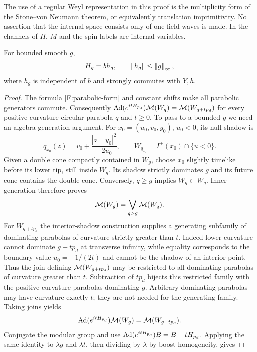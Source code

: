 The use of a regular Weyl representation in this proof is the
multiplicity form of the Stone--von Neumann theorem, or equivalently
translation imprimitivity. No assertion that the internal space consists
only of one-field waves is made. In the channels of $\Pi$, $M$ and the
spin labels are internal variables.

\begin{proposition}
\label{F:bounded-commutation}
For bounded smooth $g$,
\[
 H_g=bh_g,\qquad \left\lVert h_g\right\rVert\le\left\lVert g\right\rVert_\infty,
\]
where $h_g$ is independent of $b$ and strongly commutes with $Y,h$.
\end{proposition}

\begin{proof}
The formula \eqref{F:parabolic-form} and constant shifts make all
parabolic generators commute. Consequently
$\operatorname{Ad}(e^{itH_{p_d}})\mathcal M(W_q)=\mathcal M(W_{q+tp_d})$ for every
positive-curvature circular parabola $q$ and $t\ge0$.
To pass to a bounded $g$ we need an algebra-generation argument.
For $x_0=(u_0,v_0,y_0)$, $u_0<0$, its null shadow is
\[
 q_{x_0}(z)=v_0+\frac{|z-y_0|^2}{-2u_0},\qquad
 W_{q_{x_0}}=I^+(x_0)\cap\{u<0\}.
\]
Given a double cone compactly contained in $W_g$, choose $x_0$ slightly
timelike before its lower tip, still inside $W_g$. Its shadow strictly
dominates $g$ and its future cone contains the double cone. Conversely,
$q\ge g$ implies $W_q\subset W_g$. Inner generation therefore proves
\begin{equation}\label{F:parabolic-generation}
 \mathcal M(W_g)=\bigvee_{q>g}\mathcal M(W_q).
\end{equation}
For $W_{g+tp_d}$ the interior-shadow construction supplies a generating
subfamily of dominating parabolas of curvature strictly greater than
$t$. Indeed lower curvature cannot dominate $g+tp_d$ at transverse
infinity, while equality corresponds to the boundary value
$u_0=-1/(2t)$ and cannot be the shadow of an interior point. Thus the
join defining $\mathcal M(W_{g+tp_d})$ may be restricted to all dominating
parabolas of curvature greater than $t$. Subtraction of $tp_d$ bijects
this restricted family with the positive-curvature parabolas dominating
$g$. Arbitrary dominating parabolas may have curvature exactly $t$;
they are not needed for the generating family. Taking joins yields
\[
 \operatorname{Ad}(e^{itH_{p_d}})\mathcal M(W_g)=\mathcal M(W_{g+tp_d}).
\]
Conjugate the modular group and use
$\operatorname{Ad}(e^{itH_{p_d}})B=B-tH_{p_d}$. Applying the same identity to
$\lambda g$ and $\lambda t$, then dividing by $\lambda$ by boost
homogeneity, gives

\end{proof}
